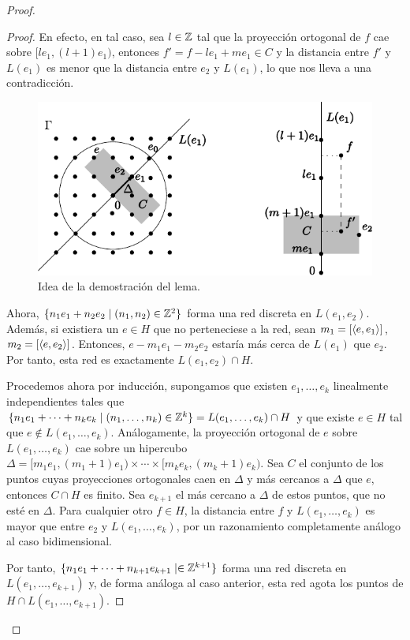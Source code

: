 \begin{proof}
\begin{proof}
    En efecto, en tal caso, sea $l \in \mathbb{Z}$ tal que la proyección ortogonal de $f$ cae sobre $[le_1,(l+1)e_1)$, entonces $f'=f-le_1+me_1 \in C$ y la distancia entre $f'$ y $L(e_1)$ es menor que la distancia entre $e_2$ y $L(e_1)$, lo que nos lleva a una contradicción.

  \begin{figure}[h]
    \centering
    \includegraphics{pics/grupo}
    \caption{Idea de la demostración del lema.}
    \label{fig:grupo}
  \end{figure}

      Ahora, $\{n_1e_1+n_2e_2 \mid (n_1,n_2) \in \mathbb{Z}^2 \}$ forma una red discreta en $L(e_1,e_2)$. Además, si existiera un $e\in H$ que no perteneciese a la red, sean $m_1=[\left\langle e,e_1\right\rangle]$, $m_2=[\left\langle e,e_2\right\rangle]$. Entonces, $e-m_1e_1-m_2e_2$ estaría más cerca de $L(e_1)$ que $e_2$. Por tanto, esta red es exactamente $L(e_1,e_2) \cap H$.

      Procedemos ahora por inducción, supongamos que existen $e_1,\dots,e_k$ linealmente independientes tales que $\{n_1e_1+\cdots+n_ke_k \mid (n_1,\dots,n_k) \in \mathbb{Z}^k \} = L(e_1,\dots,e_k) \cap H$ y que existe $e\in H$ tal que $e \not\in L(e_1,\dots,e_k)$. Análogamente, la proyección ortogonal de $e$ sobre $L(e_1,\dots,e_k)$ cae sobre un hipercubo $\Delta=[m_1e_1,(m_1+1)e_1) \times \cdots \times [m_ke_k,(m_k+1)e_k)$. Sea $C$ el conjunto de los puntos cuyas proyecciones ortogonales caen en $\Delta$ y más cercanos a $\Delta$ que $e$, entonces $C \cap H$ es finito. Sea $e_{k+1}$ el más cercano a $\Delta$ de estos puntos, que no esté en $\Delta$. Para cualquier otro $f \in H$, la distancia entre $f$ y $L(e_1,\dots,e_k)$ es mayor que entre $e_2$ y $L(e_1,\dots,e_k)$, por un razonamiento completamente análogo al caso bidimensional. 

	Por tanto, $\{n_1e_1+\dots+n_{k+1}e_{k+1} \mid \in \mathbb{Z}^{k+1}\}$ forma una red discreta en $L(e_1,\dots,e_{k+1})$ y, de forma análoga al caso anterior, esta red agota los puntos de $H\cap L(e_1,\dots,e_{k+1})$.


\end{proof}
\end{proof}

